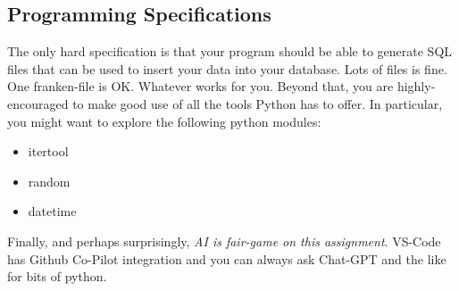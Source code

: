\documentclass[nobib]{tufte-handout}
\begin{document}
\subsection*{Programming Specifications}

The only hard specification is that your program should be able to generate SQL files that can be used to insert your data into your database. Lots of files is fine. One franken-file is OK.  Whatever works for you. Beyond that, you are highly-encouraged to make good use of all the tools Python has to offer.  In particular, you might want to explore the following python modules:
\begin{itemize}
    \item itertool 
    \item random
    \item datetime
\end{itemize}
Finally, and perhaps surprisingly, \textit{AI is fair-game on this assignment}. VS-Code has Github Co-Pilot integration and you can always ask Chat-GPT and the like for bits of python. 
\end{document}
